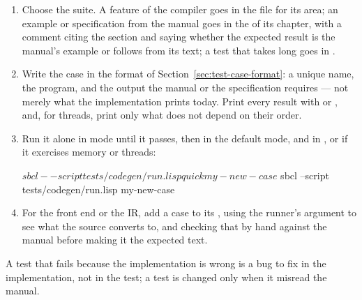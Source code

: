\begin{enumerate}
\item Choose the suite. A feature of the compiler goes in the
   file for its area; an example or
  specification from the manual goes in the
   of its chapter, with
  a comment citing the section and saying whether the expected result
  is the manual's example or follows from its text; a test that takes
  long goes in .
\item Write the case in the format of Section~\ref{sec:test-case-format}:
  a unique name, the program, and the output the manual or the
  specification requires --- not merely what the implementation prints
  today. Print every result with  or , and,
  for threads, print only what does not depend on their order.
\item Run it alone in  mode until it passes, then in the
  default mode, and in ,  or 
  if it exercises memory or threads:
\begin{shell}
$ sbcl --script tests/codegen/run.lisp quick my-new-case
$ sbcl --script tests/codegen/run.lisp my-new-case
\end{shell}
\item For the front end or the IR, add a case to its ,
  using the runner's  argument to see what the source
  converts to, and checking that by hand against the manual before
  making it the expected text.
\end{enumerate}

A test that fails because the implementation is wrong is a bug to fix
in the implementation, not in the test; a test is changed only when it
misread the manual.

\fussy
